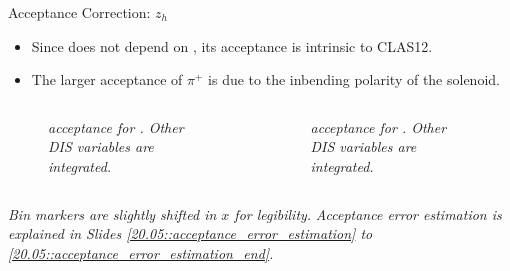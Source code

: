 \begin{frame}{Acceptance Correction: $z_h$}
    \label{11.54::zh}

    \begin{itemize}
        \item
            Since  does not depend on \efe{$\theta$}, its acceptance is intrinsic to CLAS12.

        \vspace{6pt}
        \item
            The larger acceptance of $\pi^+$ is due to the inbending polarity of the solenoid.
    \end{itemize}

    \vspace{-12pt}
    \begin{columns}
        \begin{column}{.49\linewidth}
            \begin{center}
                \begin{figure}[t]
                    \scriptsize{\textit{
                         acceptance for \ef{$\pi^-$}.
                        Other DIS variables are integrated.
                    }}
                \end{figure}
            \end{center}
        \end{column}

        \begin{column}{.49\linewidth}
            \begin{center}
                \begin{figure}[t]
                    \scriptsize{\textit{
                         acceptance for \ef{$\pi^+$}.
                        Other DIS variables are integrated.
                    }}
                \end{figure}
            \end{center}
        \end{column}
    \end{columns}

    \begin{flushright}
        \tiny{\textit{Bin markers are slightly shifted in $x$ for legibility.}}
        \tiny{\textit{Acceptance error estimation is explained in Slides \textcolor{efd_purple}{\ref{20.05::acceptance_error_estimation}} to \textcolor{efd_purple}{\ref{20.05::acceptance_error_estimation_end}}.}}
    \end{flushright}
\end{frame}

